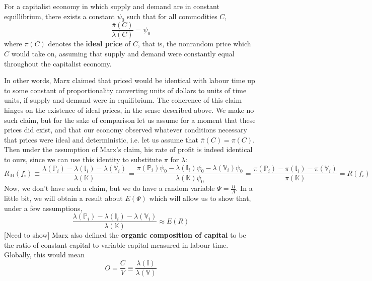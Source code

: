 \begin{claim}
	For a capitalist economy in which supply and demand are in constant equillibrium, there exists a constant $\psi_0$ such that for all commodities $C$, 
	\[ \frac{\bar{\pi}(C)}{\lambda(C)} = \psi_0 \]
where $\bar{\pi(C)}$ denotes the \textbf{ideal price} of $C$, that is, the nonrandom price which $C$ would take on, assuming that supply and demand were constantly equal throughout the capitalist economy.
\end{claim}
In other words, Marx claimed that priced would be identical with labour time up to some constant of proportionality converting units of dollars to units of time units, if supply and demand were in equilibrium. The coherence of this claim hinges on the existence of ideal prices, in the sense described above. We make no such claim, but for the sake of comparison let us assume for a moment that these prices did exist, and that our economy observed whatever conditions necessary that prices were ideal and deterministic, i.e. let us assume that $\bar{\pi}(C) = \pi(C)$. Then under the assumption of Marx's claim, his rate of profit is indeed identical to ours, since we can use this identity to substitute $\pi$ for $\lambda$: 
\[ R_M(f_i) \equiv \frac{\lambda(\mathbb{P}_i)-\lambda(\mathbb{I}_i) - \lambda(\mathbb{V}_i)}{\lambda(\mathbb{K})} = \frac{\pi(\mathbb{P}_i)\psi_0-\lambda(\mathbb{I}_i)\psi_0 - \lambda(\mathbb{V}_i)\psi_0}{\lambda(\mathbb{K})\psi_0} = \frac{\pi(\mathbb{P}_i)-\pi(\mathbb{I}_i) - \pi(\mathbb{V}_i)}{\pi(\mathbb{K})} = R(f_i) \]
Now, we don't have such a claim, but we do have a random variable $\Psi = \frac{\Pi}{\Lambda}$. In a little bit, we will obtain a result about $E(\Psi)$ which will allow us to show that, under a few assumptions, 
\[ \frac{\lambda(\mathbb{P}_i)-\lambda(\mathbb{I}_i) - \lambda(\mathbb{V}_i)}{\lambda(\mathbb{K})} \approx E(R) \]
[Need to show]
Marx also defined the \textbf{organic composition of capital} to be the ratio of constant capital to variable capital measured in labour time. Globally, this would mean
\[ O = \frac{C}{V} \equiv \frac{\lambda(\mathbb{I})}{\lambda(\mathbb{V})} \]
